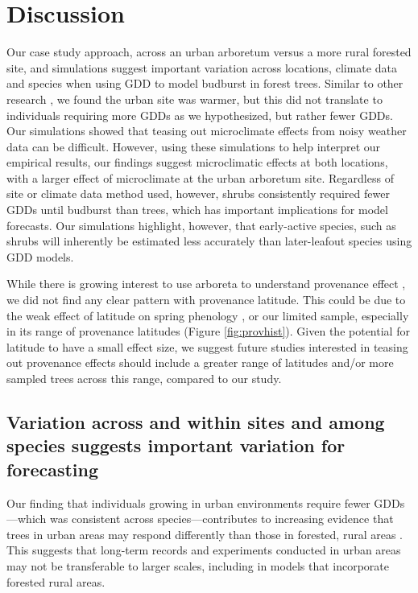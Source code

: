 \documentclass{article}\usepackage[]{graphicx}\usepackage[]{color}
\begin{document}
\section*{Discussion} 
Our case study approach, across an urban arboretum versus a more rural forested site, and simulations suggest important variation across locations, climate data and species when using GDD to model budburst in forest trees. Similar to other research \citep{Meng2020}, we found the urban site was warmer, but this did not translate to individuals requiring more GDDs as we hypothesized, but rather fewer GDDs. Our simulations showed that teasing out microclimate effects from noisy weather data can be difficult. However, using these simulations to help interpret our empirical results, our findings suggest microclimatic effects at both locations, with a larger effect of microclimate at the urban arboretum site. Regardless of site or climate data method used, however, shrubs consistently required fewer GDDs until budburst than trees, which has important implications for model forecasts. Our simulations highlight, however, that early-active species, such as shrubs will inherently be estimated less accurately than later-leafout species using GDD models. 

While there is growing interest to use arboreta to understand provenance effect \citep{Primack2009}, we did not find any clear pattern with provenance latitude. This could be due to the weak effect of latitude on spring phenology \citep{Gauzere2017}, or our limited sample, especially in its range of provenance latitudes (Figure \ref{fig:provhist}). Given the potential for latitude to have a small effect size, we suggest future studies interested in teasing out provenance effects should include a greater range of latitudes and/or more sampled trees across this range, compared to our study. 

\subsection*{Variation across and within sites and among species suggests important variation for forecasting} 
Our finding that individuals growing in urban environments require fewer GDDs---which was consistent across species---contributes to increasing evidence that trees in urban areas may respond differently than those in forested, rural areas \citep{Meng2020}. This suggests that long-term records and experiments conducted in urban areas may not be transferable to larger scales, including in models that incorporate forested rural areas. 
\end{document}
